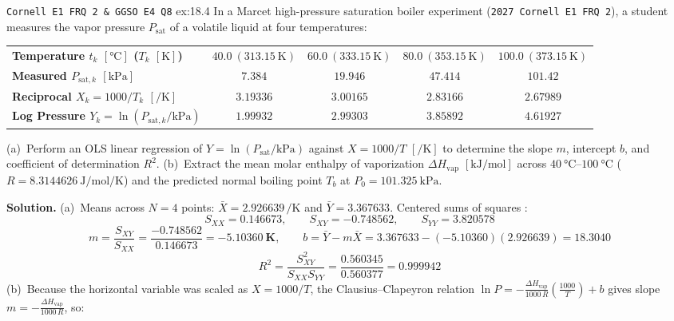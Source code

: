 \begin{workedexample}{\texttt{Cornell E1 FRQ 2 \& GGSO E4 Q8} }{ex:18.4}
In a Marcet high-pressure saturation boiler experiment (\texttt{2027 Cornell E1 FRQ 2}), a student measures the vapor pressure $P_{\mathrm{sat}}$ of a volatile liquid at four temperatures:
\begin{center}
\footnotesize
\setlength{\tabcolsep}{6.5pt}
\begin{tabular}{@{}lcccc@{}}
\toprule
\textbf{Temperature $t_k$ $[\si{\celsius}]$ ($T_k$ $[\si{\kelvin}]$)} & $40.0\ (\SI{313.15}{\kelvin})$ & $60.0\ (\SI{333.15}{\kelvin})$ & $80.0\ (\SI{353.15}{\kelvin})$ & $100.0\ (\SI{373.15}{\kelvin})$ \\
\textbf{Measured $P_{\mathrm{sat},k}$ $[\si{\kilo\pascal}]$} & $7.384$ & $19.946$ & $47.414$ & $101.42$ \\
\textbf{Reciprocal $X_k = 1000/T_k$ $[\si{\per\kelvin}]$} & $3.19336$ & $3.00165$ & $2.83166$ & $2.67989$ \\
\textbf{Log Pressure $Y_k = \ln(P_{\mathrm{sat},k}/\si{\kilo\pascal})$} & $1.99932$ & $2.99303$ & $3.85892$ & $4.61927$ \\
\bottomrule
\end{tabular}
\end{center}
(a)~Perform an OLS linear regression of $Y = \ln(P_{\mathrm{sat}}/\si{\kilo\pascal})$ against $X = 1000/T$ $[\si{\per\kelvin}]$ to determine the slope $m$, intercept $b$, and coefficient of determination $R^2$.
(b)~Extract the mean molar enthalpy of vaporization $\Delta H_{\mathrm{vap}}$ $[\si{\kilo\joule\per\mole}]$ across $\SIrange{40}{100}{\celsius}$ ($R = \SI{8.3144626}{\joule\per\mole\per\kelvin}$) and the predicted normal boiling point $T_b$ at $P_0 = \SI{101.325}{\kilo\pascal}$.
\par\smallskip\noindent
\textbf{Solution.}
(a)~Means across $N = 4$ points: $\bar{X} = 2.926639\,\si{\per\kelvin}$ and $\bar{Y} = 3.367633$. Centered sums of squares :
$$S_{XX} = \mathbf{0.146673}, \qquad S_{XY} = \mathbf{-0.748562}, \qquad S_{YY} = \mathbf{3.820578}$$
$$m = \frac{S_{XY}}{S_{XX}} = \frac{-0.748562}{0.146673} = \mathbf{\SI{-5.10360}{\kelvin}}, \qquad b = \bar{Y} - m\bar{X} = 3.367633 - (-5.10360)(2.926639) = \mathbf{18.3040}$$
$$R^2 = \frac{S_{XY}^2}{S_{XX} S_{YY}} = \frac{0.560345}{0.560377} = \mathbf{0.999942}$$
(b)~Because the horizontal variable was scaled as $X = 1000/T$, the Clausius--Clapeyron relation $\ln P = -\frac{\Delta H_{\mathrm{vap}}}{1000\,R}\left(\frac{1000}{T}\right) + b$ gives slope $m = -\frac{\Delta H_{\mathrm{vap}}}{1000\,R}$, so:

\end{workedexample}
